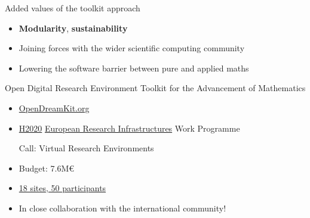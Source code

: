 \documentclass{beamer}
\begin{document}
\begin{frame}{Added values of the toolkit approach}
  \begin{itemize}
  \item \textbf{Modularity}, \textbf{sustainability}
  \item Joining forces with the wider scientific computing community
  \item Lowering the software barrier between pure and applied maths
  \end{itemize}
\end{frame}


\begin{frame}{Open Digital Research Environment Toolkit for the
    Advancement of Mathematics}

  \begin{itemize}
  \item \href{OpenDreamKit.org}{OpenDreamKit.org}
  \item \href{https://ec.europa.eu/programmes/horizon2020/}{H2020}
    \href{https://ec.europa.eu/programmes/horizon2020/en/h2020-section/european-research-infrastructures-including-e-infrastructures}{European
      Research Infrastructures} Work Programme

    Call: Virtual Research Environments

  \item Budget: 7.6M\euro

  \item \href{http://opendreamkit.org/partners}{18 sites, 50 participants}
  \item In close collaboration with the international community!
  \end{itemize}
\end{frame}
\end{document}
